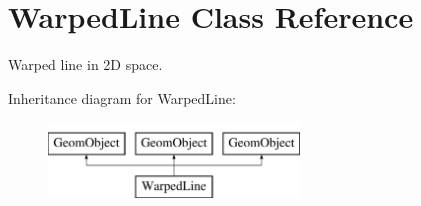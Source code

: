 \hypertarget{classWarpedLine}{}\section{Warped\+Line Class Reference}
\label{classWarpedLine}


Warped line in 2D space.  


Inheritance diagram for Warped\+Line\+:\begin{figure}[H]
\begin{center}
\leavevmode
\includegraphics[height=2.000000cm]{classWarpedLine}
\end{center}
\end{figure}
